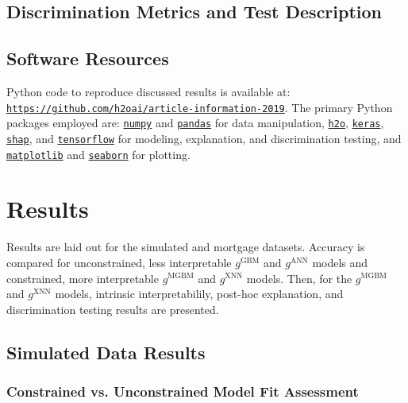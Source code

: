 \documentclass[information,article,submit,moreauthors,pdftex]{definitions/mdpi}
\begin{document}
\subsection{Discrimination Metrics and Test Description}\label{ssec:di}

\subsection{Software Resources}\label{ssec:soft}

Python code to reproduce discussed results is available at: \texttt{\url{https://github.com/h2oai/article-information-2019}}. The primary Python packages employed are: \href{https://numpy.org/}{\texttt{numpy}} and \href{https://pandas.pydata.org/}{\texttt{pandas}} for data manipulation, \href{https://github.com/h2oai/h2o-3}{\texttt{h2o}}, \href{https://keras.io/}{\texttt{keras}}, \href{https://github.com/slundberg/shap}{\texttt{shap}}, and \href{https://www.tensorflow.org/}{\texttt{tensorflow}} for modeling, explanation, and discrimination testing, and \href{https://matplotlib.org/}{\texttt{matplotlib}} and \href{https://seaborn.pydata.org/}{\texttt{seaborn}} for plotting. 

\section{Results}\label{sec:res}

Results are laid out for the simulated and mortgage datasets. Accuracy is compared for unconstrained, less interpretable $g^{\text{GBM}}$ and $g^{\text{ANN}}$ models and constrained, more interpretable $g^{\text{MGBM}}$ and $g^{\text{XNN}}$ models. Then, for the  $g^{\text{MGBM}}$ and $g^{\text{XNN}}$ models, intrinsic interpretabilily, post-hoc explanation, and discrimination testing results are presented.

\subsection{Simulated Data Results}

\subsubsection{Constrained vs. Unconstrained Model Fit Assessment}
\end{document}

